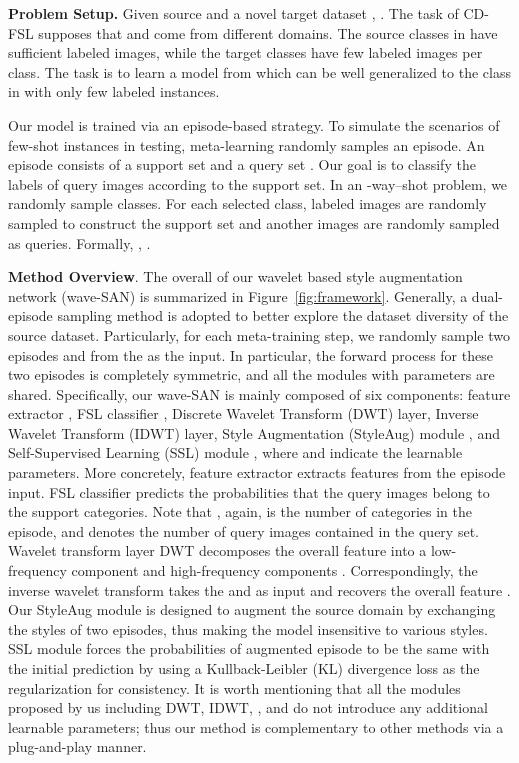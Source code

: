 \documentclass{article}
\begin{document}
\noindent\textbf{Problem Setup.} 
Given  source   and a novel target dataset , . The task of CD-FSL supposes that  and   come from different domains. The source classes in  have sufficient labeled images, while  the target classes  have few labeled images per class. The task is to learn a model from  which can be well generalized to the class  in  with only few labeled instances.

Our model is trained via an episode-based strategy. To simulate the scenarios of few-shot instances in testing, meta-learning randomly samples an episode. An episode consists of a support set  and a query set . Our goal is to classify the labels of query images according to the support set. In an -way--shot problem, we randomly sample  classes. For each selected class,  labeled images are randomly sampled to construct the support set and another  images are randomly sampled as queries. Formally, , .




\noindent\textbf{Method Overview}. The overall of our wavelet based style augmentation network (wave-SAN) is summarized in Figure~\ref{fig:framework}. Generally, a dual-episode sampling method is adopted to better explore the dataset diversity of the source dataset. Particularly, for each meta-training step, we randomly sample two episodes  and  from the  as the input. In particular, the forward process for these two episodes is completely symmetric, and all the modules with parameters are shared. Specifically,
our wave-SAN is mainly composed of six components: feature extractor , FSL classifier , Discrete Wavelet Transform (DWT) layer, Inverse Wavelet Transform (IDWT) layer, Style Augmentation (StyleAug) module , and Self-Supervised Learning (SSL) module , where  and  indicate the learnable parameters.  More concretely, feature extractor   extracts features  from the episode input. FSL classifier  predicts the probabilities  that the query images belong to the  support categories. Note that , again,  is the number of categories in the episode, and  denotes the number of query images contained in the query set. Wavelet transform layer DWT decomposes the overall feature  into a low-frequency component  and high-frequency components . Correspondingly, the inverse wavelet transform takes the  and  as input and recovers the overall feature . 
	Our StyleAug module  is designed to augment the source domain by exchanging the styles of two episodes, thus making the model insensitive to various styles. SSL module  forces the probabilities of augmented episode  to be the same with the initial prediction  by using a Kullback-Leibler (KL) divergence loss as the regularization for consistency. It is worth mentioning that all the modules proposed by us including DWT, IDWT, , and  do not introduce any additional learnable parameters; thus our method is complementary to other methods via a plug-and-play manner.
	
\end{document}
